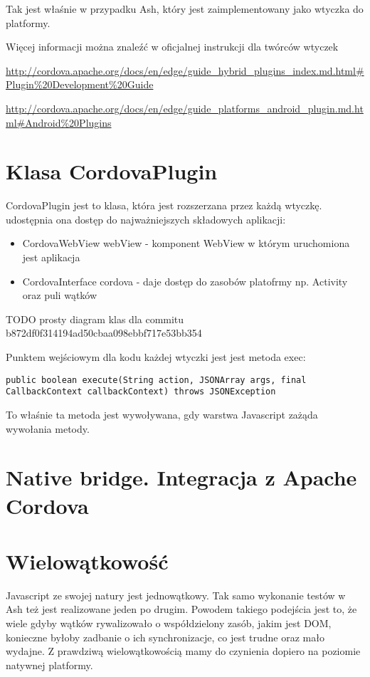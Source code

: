 \documentclass[brudnopis]{xmgr}
\begin{document}
Tak jest właśnie w przypadku Ash, który jest zaimplementowany jako wtyczka do platformy.

Więcej informacji można znaleźć w oficjalnej instrukcji dla twórców wtyczek

\url{http://cordova.apache.org/docs/en/edge/guide\_hybrid\_plugins\_index.md.html\#Plugin\%20Development\%20Guide}  

\url{http://cordova.apache.org/docs/en/edge/guide\_platforms\_android\_plugin.md.html\#Android\%20Plugins}   

\section{Klasa CordovaPlugin}

CordovaPlugin jest to klasa, która jest rozszerzana przez każdą wtyczkę. udostępnia ona dostęp do najważniejszych składowych aplikacji: 

\begin{itemize}
  \item CordovaWebView webView - komponent WebView w którym uruchomiona jest aplikacja
  \item CordovaInterface cordova - daje dostęp do zasobów platofrmy np. Activity oraz puli wątków
\end{itemize}

{TODO prosty diagram klas dla commitu b872df0f314194ad50cbaa098ebbf717e53bb354}

Punktem wejściowym dla kodu każdej wtyczki jest jest metoda exec:
\begin{lstlisting}
public boolean execute(String action, JSONArray args, final CallbackContext callbackContext) throws JSONException
\end{lstlisting}
To właśnie ta metoda jest wywoływana, gdy warstwa Javascript zażąda wywołania metody.   

\section{Native bridge. Integracja z Apache Cordova}

\section{Wielowątkowość}

Javascript ze swojej natury jest jednowątkowy. Tak samo wykonanie testów w Ash też jest realizowane jeden po drugim. Powodem takiego podejścia jest to, że wiele gdyby wątków rywalizowało o współdzielony zasób, jakim jest DOM, konieczne byłoby zadbanie o ich synchronizacje, co jest trudne oraz mało wydajne. Z prawdziwą wielowątkowością mamy do czynienia dopiero na poziomie natywnej platformy.
\end{document}
